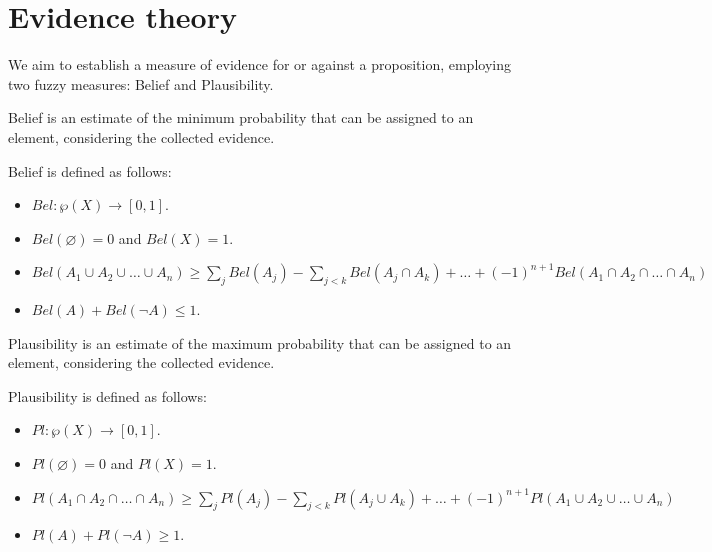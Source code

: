 \section{Evidence theory}

We aim to establish a measure of evidence for or against a proposition, employing two fuzzy measures: Belief and Plausibility.
\begin{definition}
    Belief is an estimate of the minimum probability that can be assigned to an element, considering the collected evidence.
\end{definition}
Belief is defined as follows:
\begin{itemize}
    \item $Bel:\wp (X) \rightarrow [0,1]$.
    \item $Bel(\varnothing)=0$ and $Bel(X)=1$.
    \item $Bel(A_1 \cup A_2 \cup \dots \cup A_n) \geq \sum_{j}Bel(A_j)-\sum_{j<k}Bel(A_j \cap A_k)+\dots+(-1)^{n+1}Bel(A_1 \cap A_2 \cap \dots \cap A_n)$
    \item $Bel(A)+Bel(\lnot A) \leq 1$.
\end{itemize}
\begin{definition}
    Plausibility is an estimate of the maximum probability that can be assigned to an element, considering the collected evidence. 
\end{definition} 
Plausibility is defined as follows:
\begin{itemize}
    \item $Pl:\wp (X) \rightarrow [0,1]$.
    \item $Pl(\varnothing)=0$ and $Pl(X)=1$.
    \item $Pl(A_1 \cap A_2 \cap \dots \cap A_n) \geq \sum_{j}Pl(A_j)-\sum_{j<k}Pl(A_j \cup A_k)+\dots+(-1)^{n+1}Pl(A_1 \cup A_2 \cup \dots \cup A_n)$
    \item $Pl(A)+Pl(\lnot A) \geq 1$.
\end{itemize}

